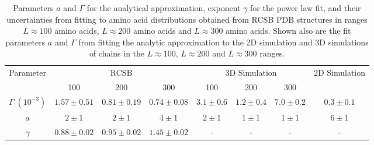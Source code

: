 \documentclass[notitlepage,
reprint,%
onecolumn,
amsmath,amssymb,superscriptaddress,aps,
pre,floatfix]{revtex4-1}
\begin{document}

\begin{table}[tb] 
\centering
\setlength{\tabcolsep}{10pt}
{\renewcommand{\arraystretch}{1.5}
\begin{tabular}{c c c c c c c c}
\hline
\multirow{2}{*}{Parameter}&\multicolumn{3}{c}{RCSB}& \multicolumn{3}{c}{3D Simulation}&\multirow{2}{*}{2D Simulation}
\\&100&200&300&100&200&300&\\
\hline
$\Gamma\; (10^{-3})$ & $1.57 \pm 0.51$ & $0.81 \pm 0.19 $ & $0.74 \pm 0.08$ & $3.1 \pm 0.6$ & $1.2 \pm 0.4$ & $7.0 \pm 0.2$ & $0.3 \pm 0.1$ \\
$a$ & $2 \pm 1$ & $2 \pm 1$ & $4 \pm 1$ & $2 \pm 1$ & $1 \pm 1$ & $1 \pm 1$ & $6 \pm 1$ \\
$\gamma$ & $0.88 \pm 0.02$ & $0.95 \pm 0.02$ & $1.45 \pm 0.02$ & - & - & - & - \\
 \hline
\end{tabular}
}
 \caption{Parameters $a$ and $\Gamma$ for the analytical approximation, exponent $\gamma$ for the power law fit, and their uncertainties from fitting to amino acid distributions obtained from RCSB PDB structures in ranges $L\approx100$ amino acids, $L\approx200$ amino acids and $L\approx300$ amino acids. Shown also are the fit parameters $a$ and $\Gamma$ from fitting the analytic approximation to the 2D simulation and 3D simulations of chains in the $L\approx100$, $L\approx200$ and $L\approx300$ ranges.}
\label{table:stats}
\end{table}
\end{document}
